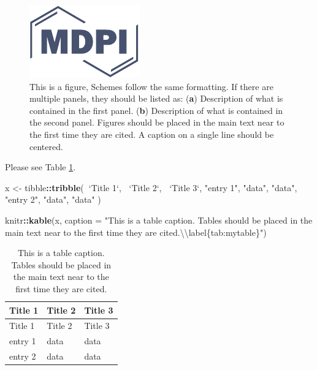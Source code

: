 \documentclass[water,article,submit,moreauthors,pdftex]{mdpi}
\newenvironment{Shaded}{\begin{snugshade}}{\end{snugshade}}
\newcommand{\CharTok}[1]{\textcolor[rgb]{0.31,0.60,0.02}{#1}}
\newcommand{\DataTypeTok}[1]{\textcolor[rgb]{0.13,0.29,0.53}{#1}}
\newcommand{\KeywordTok}[1]{\textcolor[rgb]{0.13,0.29,0.53}{\textbf{#1}}}
\newcommand{\NormalTok}[1]{#1}
\newcommand{\OperatorTok}[1]{\textcolor[rgb]{0.81,0.36,0.00}{\textbf{#1}}}
\newcommand{\StringTok}[1]{\textcolor[rgb]{0.31,0.60,0.02}{#1}}
\begin{document}
\begin{figure}

{\centering \includegraphics{logo-mdpi} 

}

\caption{This is a figure, Schemes follow the same formatting. If there are multiple panels, they should be listed as: (\textbf{a}) Description of what is contained in the first panel. (\textbf{b}) Description of what is contained in the second panel. Figures should be placed in the main text near to the first time they are cited. A caption on a single line should be centered.}\label{fig:mdpi-logo}
\end{figure}

Please see Table \ref{tab:mytable}.

\begin{Shaded}
\begin{Highlighting}[]
\NormalTok{x <-}\StringTok{ }\NormalTok{tibble}\OperatorTok{::}\KeywordTok{tribble}\NormalTok{(}\OperatorTok{~}\StringTok{`}\DataTypeTok{Title 1}\StringTok{`}\NormalTok{, }\OperatorTok{~}\StringTok{`}\DataTypeTok{Title 2}\StringTok{`}\NormalTok{, }\OperatorTok{~}\StringTok{`}\DataTypeTok{Title 3}\StringTok{`}\NormalTok{,}
\StringTok{"entry 1"}\NormalTok{, }\StringTok{"data"}\NormalTok{, }\StringTok{"data"}\NormalTok{,}
\StringTok{"entry 2"}\NormalTok{, }\StringTok{"data"}\NormalTok{, }\StringTok{"data"}
\NormalTok{)}

\NormalTok{knitr}\OperatorTok{::}\KeywordTok{kable}\NormalTok{(x, }\DataTypeTok{caption =} \StringTok{"This is a table caption. Tables should be placed in the main text near to the first time they are cited.}\CharTok{\textbackslash{}\textbackslash{}}\StringTok{label\{tab:mytable\}"}\NormalTok{)}
\end{Highlighting}
\end{Shaded}

\begin{longtable}[]{@{}lll@{}}
\caption{This is a table caption. Tables should be placed in the main
text near to the first time they are
cited.\label{tab:mytable}}\tabularnewline
\toprule
Title 1 & Title 2 & Title 3\tabularnewline
\midrule
\endfirsthead
\toprule
Title 1 & Title 2 & Title 3\tabularnewline
\midrule
\endhead
entry 1 & data & data\tabularnewline
entry 2 & data & data\tabularnewline
\bottomrule
\end{longtable}
\end{document}
